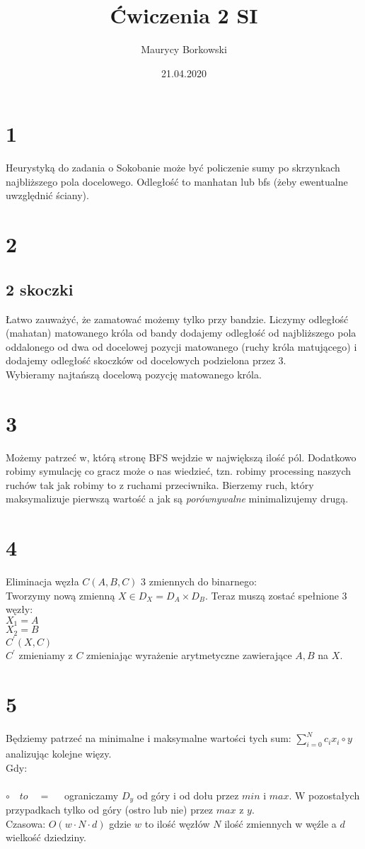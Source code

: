 \documentclass{article}
\title{Ćwiczenia 2 SI}
\date{21.04.2020}
\author{Maurycy Borkowski}
\begin{document}
\maketitle
\section{1}
Heurystyką do zadania o Sokobanie może być policzenie sumy po skrzynkach najbliższego pola docelowego. Odległość to manhatan lub bfs (żeby ewentualne uwzględnić ściany).
\section{2}
\subsection*{2 skoczki}
Łatwo zauważyć, że zamatować możemy tylko przy bandzie. Liczymy odległość (mahatan) matowanego króla od bandy dodajemy odległość od najbliższego pola oddalonego od dwa od docelowej pozycji matowanego (ruchy króla matującego) i dodajemy odległość skoczków od docelowych podzielona przez 3. \\Wybieramy najtańszą docelową pozycję matowanego króla.

\section{3}
Możemy patrzeć w, którą stronę BFS wejdzie w największą ilość pól. Dodatkowo robimy symulację co gracz może o nas wiedzieć, tzn. robimy processing naszych ruchów tak jak robimy to z ruchami przeciwnika. Bierzemy ruch, który maksymalizuje pierwszą wartość a jak są \textit {porównywalne} minimalizujemy drugą.
\section{4}
Eliminacja węzła $C(A,B,C)$ 3 zmiennych do binarnego:\\ Tworzymy nową zmienną $X \in D_X = D_A \times D_B$. Teraz muszą zostać spełnione 3 węzły:
\\$X_1 = A$
\\$X_2 = B$
\\$C^{\prime}(X,C)$\\
$C^\prime$ zmieniamy z $C$ zmieniając wyrażenie arytmetyczne zawierające $A,B$ na $X$.
\section{5}
Będziemy patrzeć na minimalne i maksymalne wartości tych sum: $\sum_{i=0}^N c_ix_i \circ y$ analizując kolejne więzy.\\
Gdy:\\\\
$\circ \quad to \quad =\quad $ ograniczamy $D_y$ od góry i od dołu przez $min$ i $max$. W pozostałych przypadkach tylko od góry (ostro lub nie) przez $max$ z $y$.\\
Czasowa: $O(w \cdot N \cdot d)$ gdzie $w$ to ilość węzłów  $N$ ilość zmiennych w węźle a $d$ wielkość dziedziny.
\end{document}
